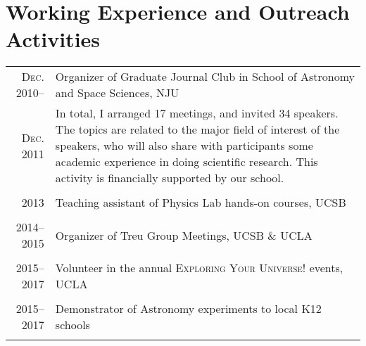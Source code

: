 \documentclass[letterpaper,10pt]{article}
\begin{document}
\section{Working Experience and Outreach Activities}
\begin{tabular}{rp{5.5in}}
\textsc{Dec. 2010}--  & Organizer of Graduate Journal Club in School of Astronomy 
and Space Sciences, NJU \\
\textsc{Dec. 2011}    & \small{In total, I arranged 17 meetings, and invited 
34 speakers.
The topics are related to the major field of interest of the speakers, who will also share with participants some academic experience in doing scientific research. This activity is financially supported by our school.}  \\
\multicolumn{2}{c}{} \\
\textsc{2013}  & Teaching assistant of Physics Lab hands-on courses, UCSB   \\
\multicolumn{2}{c}{} \\
\textsc{2014--2015}  & Organizer of Treu Group Meetings, UCSB \& UCLA \\
\multicolumn{2}{c}{} \\
\textsc{2015--2017}  & Volunteer in the annual \textsc{Exploring Your Universe!} events, UCLA \\
\multicolumn{2}{c}{} \\
\textsc{2015--2017}  & Demonstrator of Astronomy experiments to local K12 schools \\
\multicolumn{2}{c}{} \\


\end{tabular}
\end{document}
